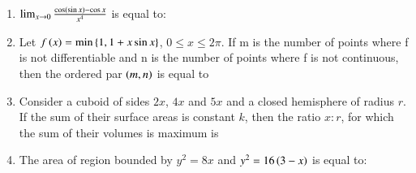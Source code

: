 \documentclass[journal,12pt,onecolumn]{IEEEtran}
\theoremstyle{remark}
\begin{document}
\begin{enumerate}
\item $\lim_{x\to 0}\frac{\cos\left(\sin x\right)-\cos x}{x^4}$ is equal to:

\hfill{}
\begin{enumerate}
\end{enumerate}

\item Let $f\left(x\right)=\min\left\{1,1+x\sin x\right\}$, $0\leq x\leq 2\pi$. If m is the number of points where f is not differentiable and n is the number of points where f is not continuous, then the ordered par $\left(m,n\right)$ is equal to

\hfill{}
\begin{enumerate}
\end{enumerate}

\item Consider a cuboid of sides $2x$, $4x$ and $5x$ and a closed hemisphere of radius $r$. If the sum of their surface areas is constant $k$, then the ratio $x:r$, for which the sum of their volumes is maximum is 

\hfill{}
\begin{enumerate}
\end{enumerate}

\item The area of region bounded by $y^2=8x$ and $y^2=16\left(3-x\right)$ is equal to:

\hfill{}
\begin{enumerate}
\end{enumerate}


\end{enumerate}
\end{document}
